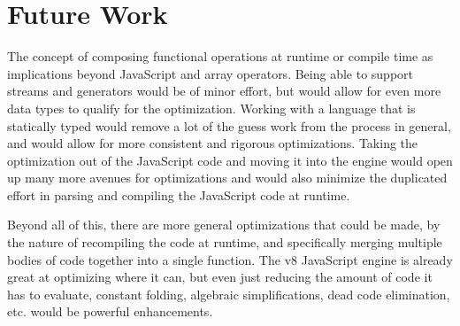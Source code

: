 \chapter{Future Work}

The concept of composing functional operations at runtime or compile time as implications beyond JavaScript and array operators. Being able to support streams and generators would be of minor effort, but would allow for even more data types to qualify for the optimization.  Working with a language that is statically typed would remove a lot of the guess work from the process in general, and would allow for more consistent and rigorous optimizations.  Taking the optimization out of the JavaScript code and moving it into the engine would open up many more avenues for optimizations and would also minimize the duplicated effort in parsing and compiling the JavaScript code at runtime.

Beyond all of this, there are more general optimizations that could be made, by the nature of recompiling the code at runtime, and specifically merging multiple bodies of code together into a single function.  The v8 JavaScript engine is already great at optimizing where it can, but even just reducing the amount of code it has to evaluate, constant folding, algebraic simplifications, dead code elimination, etc. would be powerful enhancements.